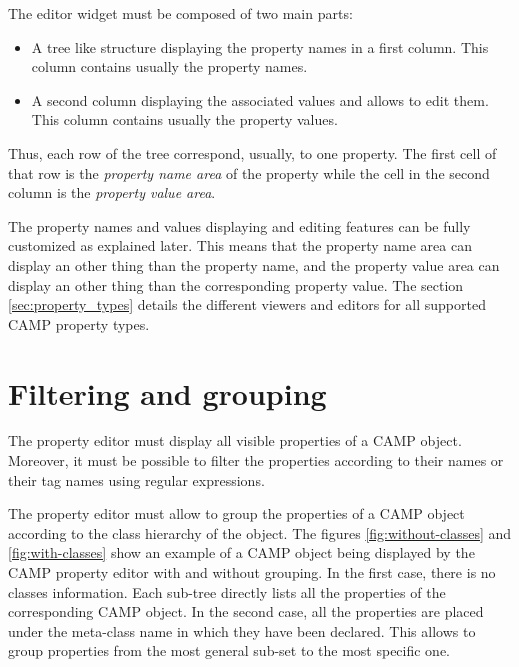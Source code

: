 \documentclass[a4paper, twoside]{report}
\begin{document}

The editor widget must be composed of two main parts:
\begin{itemize}
    \item A tree like structure displaying the property names in a first column. This column
contains usually the property names.
    \item A second column displaying the associated values and allows to edit them. This column
contains usually the property values.
\end{itemize}

Thus, each row of the tree correspond, usually, to one property. The first cell of that row is the
\emph{property name area} of the property while the cell in the second column is the \emph{property
value area}.

The property names and values displaying and editing features can be fully customized as explained
later. This means that the property name area can display an other thing than the property name, and
the property value area can display an other thing than the corresponding property value. The
section \ref{sec:property_types} details the different viewers and editors for all
supported CAMP property types.

\section{Filtering and grouping}

The property editor must display all visible properties of a CAMP object. Moreover, it must be possible
to filter the properties according to their names or their tag names using regular expressions.

The property editor must allow to group the properties of a CAMP object according to the class
hierarchy of the object. The figures \ref{fig:without-classes} and \ref{fig:with-classes} show an
example of a CAMP object being displayed by the CAMP property editor with and without grouping. In
the first case, there is no classes information. Each sub-tree directly lists all the properties of the
corresponding CAMP object. In the second case, all the properties are placed under the meta-class
name in which they have been declared. This allows to group properties from the most general sub-set to the
most specific one.

\end{document}

